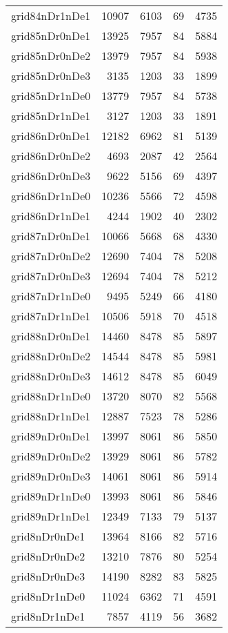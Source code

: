 \documentclass[../../../thesis.tex]{subfiles}
\begin{document}
\begin{longtable}{lrrrr}
grid84nDr1nDe1 & 10907 & 6103 & 69 & 4735 \\
grid85nDr0nDe1 & 13925 & 7957 & 84 & 5884 \\
grid85nDr0nDe2 & 13979 & 7957 & 84 & 5938 \\
grid85nDr0nDe3 & 3135 & 1203 & 33 & 1899 \\
grid85nDr1nDe0 & 13779 & 7957 & 84 & 5738 \\
grid85nDr1nDe1 & 3127 & 1203 & 33 & 1891 \\
grid86nDr0nDe1 & 12182 & 6962 & 81 & 5139 \\
grid86nDr0nDe2 & 4693 & 2087 & 42 & 2564 \\
grid86nDr0nDe3 & 9622 & 5156 & 69 & 4397 \\
grid86nDr1nDe0 & 10236 & 5566 & 72 & 4598 \\
grid86nDr1nDe1 & 4244 & 1902 & 40 & 2302 \\
grid87nDr0nDe1 & 10066 & 5668 & 68 & 4330 \\
grid87nDr0nDe2 & 12690 & 7404 & 78 & 5208 \\
grid87nDr0nDe3 & 12694 & 7404 & 78 & 5212 \\
grid87nDr1nDe0 & 9495 & 5249 & 66 & 4180 \\
grid87nDr1nDe1 & 10506 & 5918 & 70 & 4518 \\
grid88nDr0nDe1 & 14460 & 8478 & 85 & 5897 \\
grid88nDr0nDe2 & 14544 & 8478 & 85 & 5981 \\
grid88nDr0nDe3 & 14612 & 8478 & 85 & 6049 \\
grid88nDr1nDe0 & 13720 & 8070 & 82 & 5568 \\
grid88nDr1nDe1 & 12887 & 7523 & 78 & 5286 \\
grid89nDr0nDe1 & 13997 & 8061 & 86 & 5850 \\
grid89nDr0nDe2 & 13929 & 8061 & 86 & 5782 \\
grid89nDr0nDe3 & 14061 & 8061 & 86 & 5914 \\
grid89nDr1nDe0 & 13993 & 8061 & 86 & 5846 \\
grid89nDr1nDe1 & 12349 & 7133 & 79 & 5137 \\
grid8nDr0nDe1 & 13964 & 8166 & 82 & 5716 \\
grid8nDr0nDe2 & 13210 & 7876 & 80 & 5254 \\
grid8nDr0nDe3 & 14190 & 8282 & 83 & 5825 \\
grid8nDr1nDe0 & 11024 & 6362 & 71 & 4591 \\
grid8nDr1nDe1 & 7857 & 4119 & 56 & 3682 \\

\end{longtable}
\end{document}
